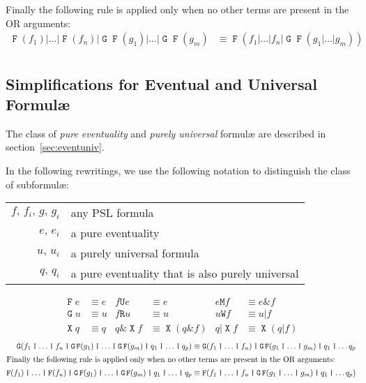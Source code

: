 \documentclass[a4paper,twoside,10pt,DIV=12,draft]{scrreprt}
\DeclareMathOperator{\F}{\texttt{F}}
\DeclareMathOperator{\G}{\texttt{G}}
\newcommand{\U}{\mathbin{\texttt{U}}}
\newcommand{\R}{\mathbin{\texttt{R}}}
\DeclareMathOperator{\X}{\texttt{X}}
\newcommand{\M}{\mathbin{\texttt{M}}}
\newcommand{\W}{\mathbin{\texttt{W}}}
\newcommand{\OR}{\mathbin{\texttt{|}}}
\newcommand{\AND}{\mathbin{\texttt{\&}}}
\newcommand{\0}{\texttt{0}}
\newcommand{\1}{\texttt{1}}
\begin{document}
Finally the following rule is applied only when no other terms are present
in the OR arguments:
\begin{align*}
  \F(f_1) \OR \ldots \OR \F(f_n) \OR \G\F(g_1) \OR \ldots \OR \G\F(g_m)
   &\equiv \F(f_1\OR \ldots \OR f_n \OR \G\F(g_1\OR \ldots \OR g_m)) \\
\end{align*}

\subsection{Simplifications for Eventual and Universal Formul\ae}
\label{sec:eventunivrew}

The class of \textit{pure eventuality} and \textit{purely universal}
formul\ae{} are described in section~\ref{sec:eventuniv}.

In the following rewritings, we use the following
notation to distinguish the class of subformul\ae:

\begin{center}
\begin{tabular}{rl}
\hline
$f,\,f_i,\,g,\,g_i$ & any PSL formula \\
$e,\,e_i$           & a pure eventuality \\
$u,\,u_i$           & a purely universal formula \\
$q,\,q_i$           & a pure eventuality that is also purely universal \\
\hline
\end{tabular}
\end{center}

\begin{align*}
  \F e &\equiv e & f \U e &\equiv e & e \M f &\equiv e\AND f \\
  \G u &\equiv u & f \R u &\equiv u &  u \W f &\equiv u\OR f \\
  \X q &\equiv q & q \AND \X f &\equiv \X(q \AND f) & q\OR \X f &\equiv \X(q \OR f)
\end{align*}
\begin{align*}
  \G(f_1\OR\ldots\OR f_n \OR \G\F(g_1)\OR\ldots\OR \G\F(g_m)\OR q_1 \OR \ldots \OR q_p)&\equiv \G(f_1\OR\ldots\OR f_n)\OR \G\F(g_1\OR\ldots\OR g_m)\OR q_1 \OR \ldots q_p \\
\intertext{Finally the following rule is applied only when no other
    terms are present in the OR arguments:}
  \F(f_1) \OR \ldots \OR \F(f_n) \OR \G\F(g_1) \OR \ldots \OR \G\F(g_m)
  \OR q_1 \OR \ldots \OR q_p
   &\equiv \F(f_1\OR \ldots \OR f_n \OR \G\F(g_1\OR \ldots\OR g_m) \OR q_1\OR \ldots q_p)
\end{align*}
\end{document}
